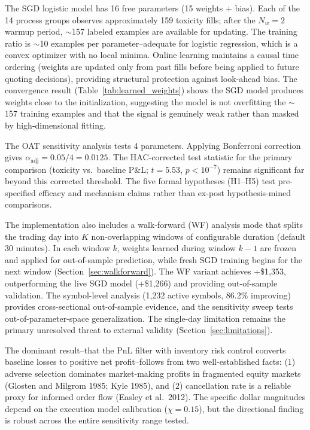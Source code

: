 \documentclass[11pt]{article}
\theoremstyle{definition}
\begin{document}
The SGD logistic model has 16 free parameters (15 weights $+$ bias). Each of the 14 process groups observes approximately 159 toxicity fills; after the $N_w = 2$ warmup period, $\sim$157 labeled examples are available for updating. The training ratio is $\sim$10 examples per parameter--adequate for logistic regression, which is a convex optimizer with no local minima. Online learning maintains a causal time ordering (weights are updated only from past fills before being applied to future quoting decisions), providing structural protection against look-ahead bias. The convergence result (Table~\ref{tab:learned_weights}) shows the SGD model produces weights close to the initialization, suggesting the model is not overfitting the $\sim$157 training examples and that the signal is genuinely weak rather than masked by high-dimensional fitting.

The OAT sensitivity analysis tests 4 parameters. Applying Bonferroni correction gives $\alpha_{\text{adj}} = 0.05/4 = 0.0125$. The HAC-corrected test statistic for the primary comparison (toxicity vs.\ baseline P\&L; $t = 5.53$, $p < 10^{-7}$) remains significant far beyond this corrected threshold. The five formal hypotheses (H1--H5) test pre-specified efficacy and mechanism claims rather than ex-post hypothesis-mined comparisons.

The implementation also includes a walk-forward (WF) analysis mode that splits the trading day into $K$ non-overlapping windows of configurable duration (default 30 minutes). In each window $k$, weights learned during window $k-1$ are frozen and applied for out-of-sample prediction, while fresh SGD training begins for the next window (Section~\ref{sec:walkforward}). The WF variant achieves +\$1,353, outperforming the live SGD model (+\$1,266) and providing out-of-sample validation. The symbol-level analysis (1,232 active symbols, 86.2\% improving) provides cross-sectional out-of-sample evidence, and the sensitivity sweep tests out-of-parameter-space generalization. The single-day limitation remains the primary unresolved threat to external validity (Section~\ref{sec:limitations}).

The dominant result--that the PnL filter with inventory risk control converts baseline losses to positive net profit--follows from two well-established facts: (1) adverse selection dominates market-making profits in fragmented equity markets (Glosten and Milgrom 1985; Kyle 1985), and (2) cancellation rate is a reliable proxy for informed order flow (Easley et al.\ 2012). The specific dollar magnitudes depend on the execution model calibration ($\chi = 0.15$), but the directional finding is robust across the entire sensitivity range tested.
\end{document}
